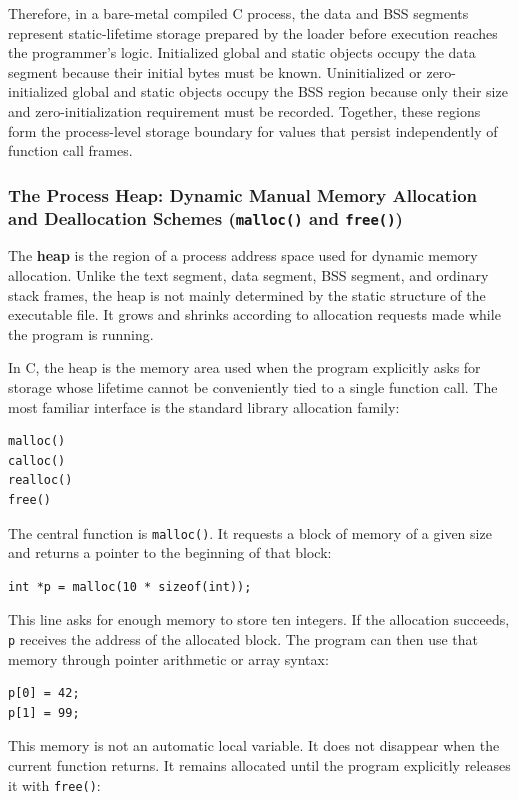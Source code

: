 Therefore, in a bare-metal compiled C process, the data and BSS segments represent static-lifetime storage prepared by the loader before execution reaches the programmer's logic. Initialized global and static objects occupy the data segment because their initial bytes must be known. Uninitialized or zero-initialized global and static objects occupy the BSS region because only their size and zero-initialization requirement must be recorded. Together, these regions form the process-level storage boundary for values that persist independently of function call frames.


\subsubsection{The Process Heap: Dynamic Manual Memory Allocation and Deallocation Schemes (\texttt{malloc()} and \texttt{free()})}

The \textbf{heap} is the region of a process address space used for dynamic memory allocation. Unlike the text segment, data segment, BSS segment, and ordinary stack frames, the heap is not mainly determined by the static structure of the executable file. It grows and shrinks according to allocation requests made while the program is running.

In C, the heap is the memory area used when the program explicitly asks for storage whose lifetime cannot be conveniently tied to a single function call. The most familiar interface is the standard library allocation family:

\begin{verbatim}
malloc()
calloc()
realloc()
free()
\end{verbatim}

The central function is \texttt{malloc()}. It requests a block of memory of a given size and returns a pointer to the beginning of that block:

\begin{verbatim}
int *p = malloc(10 * sizeof(int));
\end{verbatim}

This line asks for enough memory to store ten integers. If the allocation succeeds, \texttt{p} receives the address of the allocated block. The program can then use that memory through pointer arithmetic or array syntax:

\begin{verbatim}
p[0] = 42;
p[1] = 99;
\end{verbatim}

This memory is not an automatic local variable. It does not disappear when the current function returns. It remains allocated until the program explicitly releases it with \texttt{free()}:

